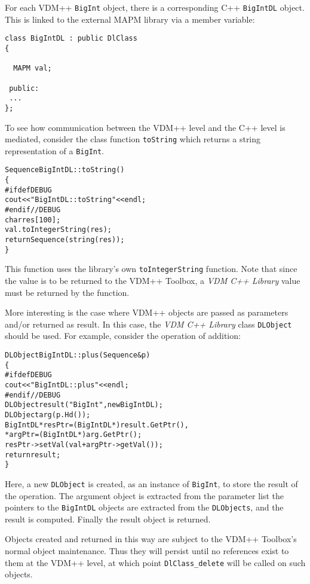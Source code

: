 \documentclass[\pformat,12pt]{article}
\newcommand{\vdmcpplib}{\textit{VDM C++ Library}}
\begin{document}
For each VDM++ \texttt{BigInt} object, there is a corresponding C++ \texttt{BigIntDL}
object. This is linked to the external MAPM library via a member
variable: 
\begin{verbatim}
class BigIntDL : public DlClass
{

  MAPM val;
 
 public:
 ...
};
\end{verbatim}



To see how communication between the VDM++ level and the C++ level is
mediated, consider the class function \texttt{toString} which returns
a string representation of a \texttt{BigInt}.

\begin{alltt}
Sequence BigIntDL::toString()
\{
\#ifdef DEBUG
  cout << "BigIntDL::toString" << endl;
\#endif //DEBUG
  char res[100];
  val.toIntegerString(res);
  return Sequence(string(res));
\}
\end{alltt}
This function uses the library's own \texttt{toIntegerString}
function. Note that since the value is to be returned to the VDM++
Toolbox, a {\vdmcpplib} value must be returned by the function. 

More interesting is the case where VDM++ objects are passed as
parameters and/or returned as result. In this case, the {\vdmcpplib}
class \texttt{DLObject} should be used. For example, consider the
operation of addition:
\begin{alltt}
DLObject BigIntDL::plus (Sequence &p)
\{
\#ifdef DEBUG
  cout << "BigIntDL::plus" << endl;
\#endif //DEBUG
  DLObject result("BigInt", new BigIntDL);
  DLObject arg (p.Hd());
  BigIntDL *resPtr = (BigIntDL*) result.GetPtr(),
           *argPtr = (BigIntDL*) arg.GetPtr(); 
  resPtr->setVal( val + argPtr->getVal());
  return result;
\}
\end{alltt}
Here, a new \texttt{DLObject} is created, as an instance of \texttt{BigInt}, to store
the result of the operation. The argument object is extracted from the
parameter list the pointers to the \texttt{BigIntDL} objects are extracted
from the \texttt{DLObjects}, and the result is computed. Finally the
result object is returned. 

Objects created and returned in this way are subject to the VDM++
Toolbox's normal object maintenance. Thus they will persist until no
references exist to them at the VDM++ level, at which point
\texttt{DlClass\_delete} will be called on such objects.
\end{document}

